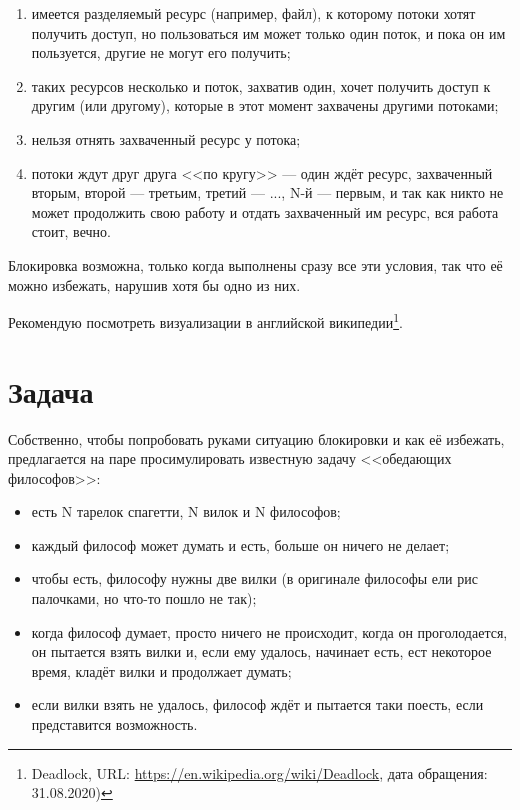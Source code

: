 \documentclass[a5paper]{article}
\begin{document}
\begin{enumerate}
    \item имеется разделяемый ресурс (например, файл), к которому потоки хотят получить доступ, но пользоваться им может только один поток, и пока он им пользуется, другие не могут его получить;
    \item таких ресурсов несколько и поток, захватив один, хочет получить доступ к другим (или другому), которые в этот момент захвачены другими потоками;
    \item нельзя отнять захваченный ресурс у потока;
    \item потоки ждут друг друга <<по кругу>> --- один ждёт ресурс, захваченный вторым, второй --- третьим, третий --- ..., N-й --- первым, и так как никто не может продолжить свою работу и отдать захваченный им ресурс, вся работа стоит, вечно.
\end{enumerate}

Блокировка возможна, только когда выполнены сразу все эти условия, так что её можно избежать, нарушив хотя бы одно из них.

Рекомендую посмотреть визуализации в английской википедии\footnote{Deadlock, URL: \url{https://en.wikipedia.org/wiki/Deadlock}, дата обращения: 31.08.2020)}.

\section{Задача}

Собственно, чтобы попробовать руками ситуацию блокировки и как её избежать, предлагается на паре просимулировать известную задачу <<обедающих философов>>:

\begin{itemize}
    \item есть N тарелок спагетти, N вилок и N философов;
    \item каждый философ может думать и есть, больше он ничего не делает;
    \item чтобы есть, философу нужны две вилки (в оригинале философы ели рис палочками, но что-то пошло не так);
    \item когда философ думает, просто ничего не происходит, когда он проголодается, он пытается взять вилки и, если ему удалось, начинает есть, ест некоторое время, кладёт вилки и продолжает думать;
    \item если вилки взять не удалось, философ ждёт и пытается таки поесть, если представится возможность.
\end{itemize}
\end{document}
